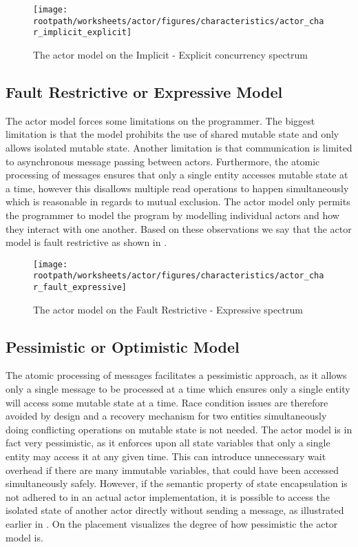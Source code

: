 \begin{figure}[htbp]
\centering
 \texttt{[image: \\rootpath/worksheets/actor/figures/characteristics/actor\_char\_implicit\_explicit]} 
 \caption{The actor model on the Implicit - Explicit concurrency spectrum}
\label{fig:actor_implicit_explicit}
\end{figure}
\subsection{Fault Restrictive or Expressive Model}\label{sec_actor_fault_express}
The actor model forces some limitations on the programmer. The biggest limitation is that the model prohibits the use of shared mutable state and only allows isolated mutable state. Another limitation is that communication is limited to asynchronous message passing between actors. Furthermore, the atomic processing of messages ensures that only a single entity accesses mutable state at a time, however this disallows multiple read operations to happen simultaneously which is reasonable in regards to mutual exclusion. The actor model only permits the programmer to model the program by modelling individual actors and how they interact with one another. Based on these observations we say that the actor model is fault restrictive as shown in .

\begin{figure}[htbp]
\centering
 \texttt{[image: \\rootpath/worksheets/actor/figures/characteristics/actor\_char\_fault\_expressive]} 
 \caption{The actor model on the Fault Restrictive - Expressive spectrum}
\label{fig:actor_fault_expressive}
\end{figure}

\subsection{Pessimistic or Optimistic Model}
The atomic processing of messages facilitates a pessimistic approach, as it allows only a single message to be processed at a time which ensures only a single entity will access some mutable state at a time. Race condition issues are therefore avoided by design and a recovery mechanism for two entities simultaneously doing conflicting operations on mutable state is not needed. The actor model is in fact very pessimistic, as it enforces upon all state variables that only a single entity may access it at any given time. This can introduce unnecessary wait overhead if there are many immutable variables, that could have been accessed simultaneously safely. However, if the semantic property of state encapsulation is not adhered to in an actual actor implementation, it is possible to access the isolated state of another actor directly without sending a message, as illustrated earlier in . On  the placement visualizes the degree of how pessimistic the actor model is.

